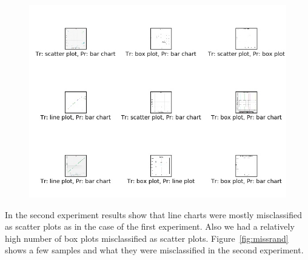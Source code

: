\documentclass[12pt, a4paper,oneside]{report}
\begin{document}
\begin{figure}[!htbp]
	\includegraphics [scale=0.78] {error.jpg}
	\label{fig:missy}
\end{figure}

In the second experiment results show that line charts were mostly misclassified as scatter plots as in the case of the first experiment. Also we had a relatively high number of box plots misclassified as scatter plots. Figure~\ref{fig:missrand} shows a few samples and what they were misclassified in the second experiment. 
\end{document}
